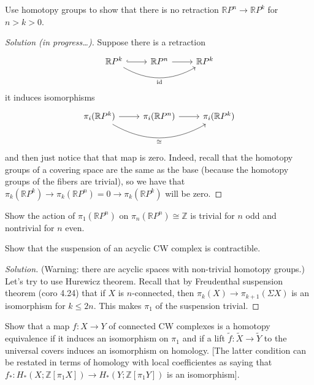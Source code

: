 \documentclass{article}
\numberwithin{equation}{section}
\newcommand{\R}{\mathbb{R}}
\newcommand{\Z}{\mathbb{Z}}
\DeclareMathOperator{\id}{id}
\begin{document}
\begin{exercise}[4.2.1]
	Use homotopy groups to show that there is no retraction $\R P^n\to \R P^k$ for $n>k>0$.
\end{exercise}
\begin{proof}[Solution (in progress…)]
	Suppose there is a retraction
	\[\begin{tikzcd}
		\R P^k\arrow[r,hook]\arrow[rr,bend right,swap,"\id"]&\R P^n\arrow[r]&\R P^k
	\end{tikzcd}\]
	it induces isomorphisms
	\[\begin{tikzcd}
		\pi_i(\R P^k)\arrow[r]\arrow[rr,bend right,swap,"\cong"]&\pi_i(\R P^n)\arrow[r]&\pi_i(\R P^k)
	\end{tikzcd}\]
	and then just notice that that map is zero. Indeed, recall that the homotopy groups of a covering space are the same as the base (because the homotopy groups of the fibers are trivial), so we have that $\pi_k(\R P^k)\to\pi_k(\R P^n)=0\to\pi_k(\R P^k)$ will be zero. 
\end{proof}

\begin{exercise}[4.2.2]
	Show the action of $\pi_1(\R P^n)$ on $\pi_n(\R P^n)\cong\Z$ is trivial for $n$ odd and nontrivial for $n$ even.
\end{exercise}

\begin{exercise}[4.2.8]
	Show that the suspension of an acyclic CW complex is contractible.
\end{exercise}
\begin{proof}[Solution]
	(Warning: there are acyclic spaces with non-trivial homotopy groups.) Let's try to use Hurewicz theorem. Recall that by Freudenthal suspension theorem (coro 4.24) that if $X$ is $n$-connected, then $\pi_{k}(X)\to\pi_{k+1}(\Sigma X)$ is an isomorphism for $k\leq 2n$. This makes $\pi_1$ of the suspension trivial.
\end{proof}


\begin{exercise}[4.2.12]
	Show that a map $f:X\to Y$ of connected CW complexes is a homotopy equivalence if it induces an isomorphism on $\pi_1$ and if a lift $\widetilde{f}:\widetilde{X}\to \widetilde{Y}$ to the universal covers induces an isomorphism on homology. [The latter condition can be restated in terms of homology with local coefficientes as saying that $f_*:H_*(X;\Z[\pi_1X])\to H_*(Y;\Z[\pi_1Y])$ is an isomorphism]. 
\end{exercise}
\end{document}
